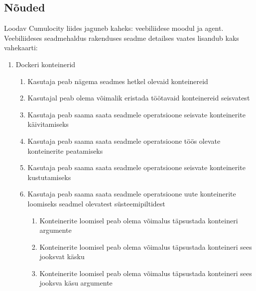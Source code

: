 \documentclass[12pt]{article}
\begin{document}
  \subsection{Nõuded}
  Loodav Cumulocity liides jaguneb kaheks: veebiliidese moodul ja agent.
  \newline
  \newline
  \noindent
  Veebiliideses seadmehaldus rakenduses seadme detailses vaates lisandub kaks vahekaarti:
  \renewcommand{\labelenumii}{\theenumii.}
  \renewcommand{\theenumii}{\theenumi.\arabic{enumii}}
  \renewcommand{\labelenumiii}{\theenumiii.}
  \renewcommand{\theenumiii}{\theenumii.\arabic{enumiii}}
  \begin{enumerate}
    \item Dockeri konteinerid
    \begin{enumerate}
      \item Kasutaja peab nägema seadmes hetkel olevaid konteinereid
      \item Kasutajal peab olema võimalik eristada töötavaid konteinereid seisvatest
      \item Kasutaja peab saama saata seadmele operatsioone seisvate konteinerite käivitamiseks
      \item Kasutaja peab saama saata seadmele operatsioone töös olevate konteinerite peatamiseks
      \item Kasutaja peab saama saata seadmele operatsioone seisvate konteinerite kustutamiseks
      \item Kasutaja peab saama saata seadmele operatsioone uute konteinerite loomiseks seadmel olevatest süsteemipiltidest
      \begin{enumerate}
        \item Konteinerite loomisel peab olema võimalus täpsustada konteineri argumente
        \item Konteinerite loomisel peab olema võimalus täpsustada konteineri sees jooksvat käsku
        \item Konteinerite loomisel peab olema võimalus täpsustada konteineri sees jooksva käsu argumente
      \end{enumerate}
  

\end{enumerate}
\end{enumerate}
\end{document}

